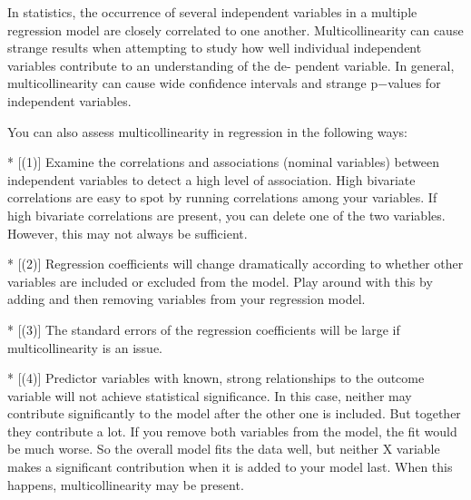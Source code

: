 In statistics, the occurrence of several independent variables in a multiple regression model are
closely correlated to one another. Multicollinearity can cause strange results when attempting
to study how well individual independent variables contribute to an understanding of the de-
pendent variable. In general, multicollinearity can cause wide confidence intervals and strange
p−values for independent variables.

\bigskip

You can also assess multicollinearity in regression in the following ways:

\begin{itemize}
*  [(1)] Examine the correlations and associations (nominal variables) between independent variables to detect a high level of association. High bivariate correlations are easy to spot by running correlations among your variables. If high bivariate correlations are present, you can delete one of the two variables. However, this may not always be sufficient.

*  [(2)] Regression coefficients will change dramatically according to whether other variables are included or excluded from the model. Play around with this by adding and then removing variables from your regression model.

*  [(3)] The standard errors of the regression coefficients will be large if multicollinearity is an issue.

*  [(4)] Predictor variables with known, strong relationships to the outcome variable will not achieve statistical significance. In this case, neither may contribute significantly to the model after the other one is included. But together they contribute a lot. If you remove both variables from the model, the fit would be much worse. So the overall model fits the data well, but neither X variable makes a significant contribution when it is added to your model last. When this happens, multicollinearity may be present.

\end{itemize}



